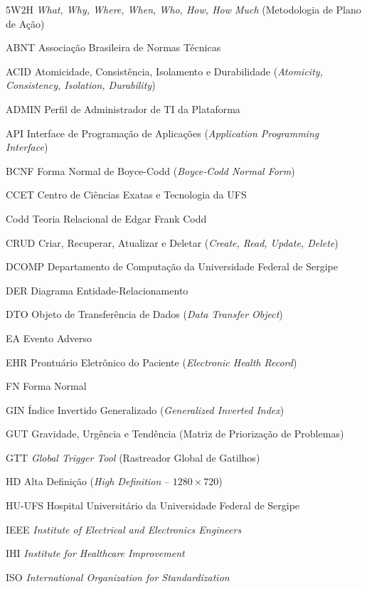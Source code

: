 \begin{siglas}
    \item[5W2H] \textit{What, Why, Where, When, Who, How, How Much} (Metodologia de Plano de Ação)
    \item[ABNT] Associação Brasileira de Normas Técnicas
    \item[ACID] Atomicidade, Consistência, Isolamento e Durabilidade (\textit{Atomicity, Consistency, Isolation, Durability})
    \item[ADMIN] Perfil de Administrador de TI da Plataforma
    \item[API] Interface de Programação de Aplicações (\textit{Application Programming Interface})
    \item[BCNF] Forma Normal de Boyce-Codd (\textit{Boyce-Codd Normal Form})
    \item[CCET] Centro de Ciências Exatas e Tecnologia da UFS
    \item[Codd] Teoria Relacional de Edgar Frank Codd
    \item[CRUD] Criar, Recuperar, Atualizar e Deletar (\textit{Create, Read, Update, Delete})
    \item[DCOMP] Departamento de Computação da Universidade Federal de Sergipe
    \item[DER] Diagrama Entidade-Relacionamento
    \item[DTO] Objeto de Transferência de Dados (\textit{Data Transfer Object})
    \item[EA] Evento Adverso
    \item[EHR] Prontuário Eletrônico do Paciente (\textit{Electronic Health Record})
    \item[FN] Forma Normal
    \item[GIN] Índice Invertido Generalizado (\textit{Generalized Inverted Index})
    \item[GUT] Gravidade, Urgência e Tendência (Matriz de Priorização de Problemas)
    \item[GTT] \textit{Global Trigger Tool} (Rastreador Global de Gatilhos)
    \item[HD] Alta Definição (\textit{High Definition} -- $1280 \times 720$)
    \item[HU-UFS] Hospital Universitário da Universidade Federal de Sergipe
    \item[IEEE] \textit{Institute of Electrical and Electronics Engineers}
    \item[IHI] \textit{Institute for Healthcare Improvement}
    \item[ISO] \textit{International Organization for Standardization}

\end{siglas}
